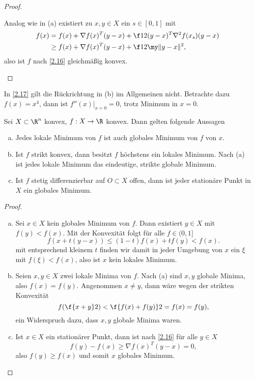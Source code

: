 \begin{st}
\begin{proof}
\begin{enumerate}[(a)]
				\begin{segnb}[„$\impliedby$“]
					Analog wie in (a) existiert zu $x,y \in X$ ein $s \in [0,1]$ mit
					\begin{align*}
						f(x)
						&= f(x) + \nabla f(x)^T (y-x) + \f 12 (y-x)^T \nabla^2 f(x_s) (y-x) \\
						&\ge f(x) + \nabla f(x)^T (y-x) + \f 12 \my \|y-x\|^2,
					\end{align*}
					also ist $f$ nach \ref{2.16} gleichmäßig konvex.
				\end{segnb}
		\end{enumerate}
	\end{proof}
\end{st}

\begin{ex} \label{2.18}
	In \ref{2.17} gilt die Rückrichtung in (b) im Allgemeinen nicht.
	Betrachte dazu $f(x) = x^4$, dann ist $f''(x)\big|_{x=0} = 0$, trotz Minimum in $x=0$.
\end{ex}


\begin{st} \label{2.19}
	Sei $X \subset \R^n$ konvex, $f: X \to \R$ konvex.
	Dann gelten folgende Aussagen
	\begin{enumerate}[(a)]
		\item
			Jedes lokale Minimum von $f$ ist auch globales Minimum von $f$ von $x$.
		\item
			Ist $f$ strikt konvex, dann besitzt $f$ höchstens ein lokales Minimum.
			Nach (a) ist jedes lokale Minimum das eindeutige, strikte globale Minimum.
		\item
			Ist $f$ stetig differenzierbar auf $O \subset X$ offen, dann ist jeder stationäre Punkt in $X$ ein globales Minimum.
	\end{enumerate}
	\begin{proof}
		\begin{enumerate}[(a)]
			\item
				Sei $x \in X$ kein globales Minimum von $f$.
				Dann existiert $y \in X$ mit $f(y) < f(x)$.
				Mit der Konvexität folgt für alle $f \in (0,1]$
				\[
					f(x+t(y-x))
					\le (1-t)f(x) + t f(y)
					< f(x).
				\]
				mit entsprechend kleinem $t$ finden wir damit in jeder Umgebung von $x$ ein $\xi$ mit $f(\xi) < f(x)$, also ist $x$ kein lokales Minimum.
			\item
				Seien $x,y \in X$ zwei lokale Minima von $f$.
				Nach (a) sind $x,y$ globale Minima, also $f(x) = f(y)$.
				Angenommen $x \neq y$, dann wäre wegen der strikten Konvexität
				\[
					f(\f {x+y}2)
					< \f{f(x) + f(y)}2
					= f(x)
					= f(y),
				\]
				ein Widerspruch dazu, dass $x,y$ globale Minima waren.
			\item
				Ist $x \in X$ ein stationärer Punkt, dann ist nach \ref{2.16} für alle $y\in X$
				\[
					f(y) - f(x)
					\ge \nabla f(x)^T (y-x)
					= 0,
				\]
				also $f(y) \ge f(x)$ und somit $x$ globales Minimum.
		\end{enumerate}
	\end{proof}
\end{st}


